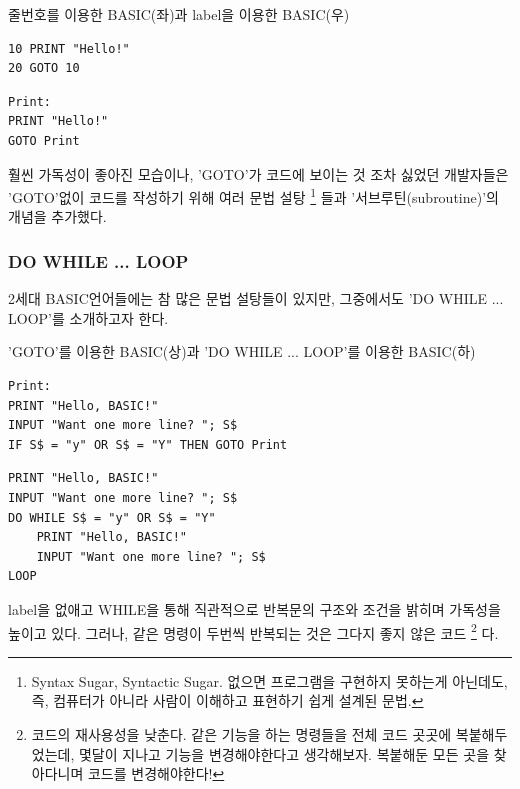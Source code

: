 \documentclass{article}
\begin{document}
\begin{center}

    \centering
    
    줄번호를 이용한 BASIC(좌)과 label을 이용한 BASIC(우)

    \begin{minipage}{0.45\textwidth}
        \begin{lstlisting}
10 PRINT "Hello!"
20 GOTO 10
        \end{lstlisting}
    \end{minipage}
    \hfill
    \begin{minipage}{0.45\textwidth}
        \begin{lstlisting}
Print:
PRINT "Hello!"
GOTO Print
        \end{lstlisting}
    \end{minipage}

\end{center}

훨씬 가독성이 좋아진 모습이나,
'GOTO'가 코드에 보이는 것 조차 싫었던 개발자들은 'GOTO'없이 코드를 작성하기 위해 여러 문법 설탕
\footnote{
    Syntax Sugar, Syntactic Sugar.
    없으면 프로그램을 구현하지 못하는게 아닌데도, 즉, 컴퓨터가 아니라 사람이 이해하고 표현하기 쉽게 설계된 문법.
}
들과 '서브루틴(subroutine)'의 개념을 추가했다.

\subsubsection{DO WHILE ... LOOP}

2세대 BASIC언어들에는 참 많은 문법 설탕들이 있지만, 그중에서도 'DO WHILE ... LOOP'를 소개하고자 한다.



'GOTO'를 이용한 BASIC(상)과 'DO WHILE ... LOOP'를 이용한 BASIC(하)

\begin{lstlisting}
Print:
PRINT "Hello, BASIC!"
INPUT "Want one more line? "; S$
IF S$ = "y" OR S$ = "Y" THEN GOTO Print
\end{lstlisting}
\begin{lstlisting}
PRINT "Hello, BASIC!"
INPUT "Want one more line? "; S$
DO WHILE S$ = "y" OR S$ = "Y"
    PRINT "Hello, BASIC!"
    INPUT "Want one more line? "; S$
LOOP
\end{lstlisting}

label을 없애고 WHILE을 통해 직관적으로 반복문의 구조와 조건을 밝히며 가독성을 높이고 있다.
그러나, 같은 명령이 두번씩 반복되는 것은 그다지 좋지 않은 코드
\footnote{
    코드의 재사용성을 낮춘다. 같은 기능을 하는 명령들을 전체 코드 곳곳에 복붙해두었는데,
    몇달이 지나고 기능을 변경해야한다고 생각해보자.
    복붙해둔 모든 곳을 찾아다니며 코드를 변경해야한다!
}
다. 
\end{document}

